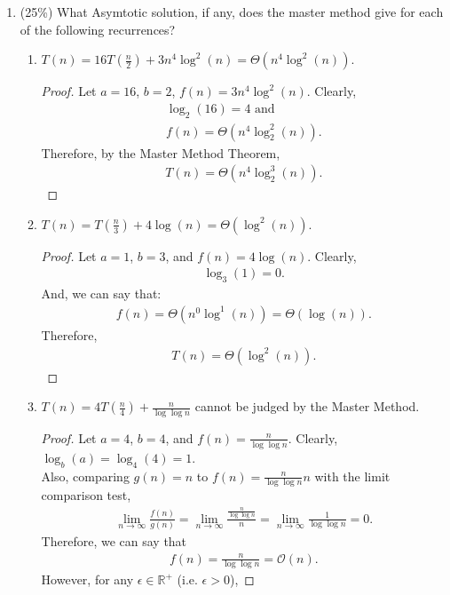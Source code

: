 \documentclass[11pt]{article}
\begin{document}
\begin{enumerate}
\item (25\%)  What Asymtotic solution, if any, does the master method give  for each of the following recurrences?
\\
\begin{enumerate}
\item $T(n) = 16T(\frac{n}{2}) + 3n^4\log^2(n) = \Theta(n^4 \log^2(n))$.
\begin{proof}
Let $a = 16$, $b = 2$, $f(n) = 3n^4 \log^2(n)$.  Clearly, 
\begin{align*}
\log_2(16) = 4 \text{ and } \\
f(n) = \Theta(n^4 \log_2^2(n)).
\end{align*}  Therefore, by the Master Method Theorem, 
\begin{align*}
T(n) = \Theta(n^4 \log_2^3(n)).
\end{align*}
\end{proof}
\item $T(n) = T(\frac{n}{3}) + 4 \log(n) = \Theta( \log^2(n))$.
\begin{proof}
Let $a = 1$, $b = 3$, and $f(n) = 4 \log(n)$.  Clearly,
\begin{align*}
\log_3(1) = 0.
\end{align*}
And, we can say that:
\begin{align*}
f(n) = \Theta(n^0 \log^1(n))= \Theta( \log(n)).
\end{align*}
Therefore,
\begin{align*}
T(n) = \Theta(\log^2(n)).
\end{align*}
\end{proof}
\item $T(n) = 4T(\frac{n}{4}) + \frac{n}{\log \log n}$ cannot be judged by the Master Method.
\begin{proof}
Let $a = 4$, $b=4$, and $f(n) = \frac{n}{\log \log n}$.  Clearly, $\log_b(a) = \log_4(4) = 1$.  \\
Also, comparing $g(n)=n$ to $f(n)=\frac{n}{\log \log n}{n}$ with the limit comparison test, 
\begin{align*}
\lim_{n \to \infty}\frac{f(n)}{g(n)}=\lim_{n \to \infty} \frac{\frac{n}{\log \log n}}{n} = \lim_{n \to \infty} \frac{1}{\log \log n} = 0.
\end{align*}
Therefore, we can say that
\begin{align*}
f(n) = \frac{n}{\log \log n}  =\mathcal{O}(n).
\end{align*}
However, for any $\epsilon \in \mathbb{R^+}$ (i.e. $\epsilon>0$),

\end{proof}
\end{enumerate}
\end{enumerate}
\end{document}
